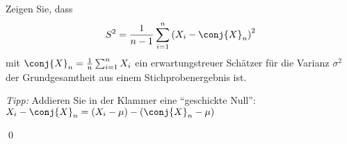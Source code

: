 \documentclass{abgabe}
\begin{document}
\begin{questions}
    \question
    Zeigen Sie, dass 
    \[ 
        S^2 = \frac{1}{n-1} \sum^n_{i=1} \left( X_i - \conj{X}_n \right)^2
    \]
    mit $\conj{X}_n = \frac{1}{n} \sum^n_{i=1} X_i$ ein erwartungstreuer Schätzer für die Varianz $\sigma^2$ der Grundgesamtheit aus einem Stichprobenergebnis ist.
    
    \emph{Tipp:} Addieren Sie in der Klammer eine \enquote{geschickte Null}: $X_i - \conj{X}_n = (X_i - \mu) - (\conj{X}_n - \mu)$
    \begin{solution}

        \qed
    \end{solution}
\end{questions}
\end{document}
